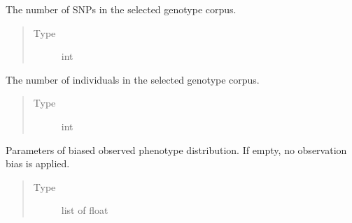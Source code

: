 \documentclass[a4paper,10pt,english]{sphinxhowto}
\begin{document}
\begin{fulllineitems}
\begin{fulllineitems}
\begin{quote}
\begin{description}
\end{description}\end{quote}

\end{fulllineitems}


\begin{fulllineitems}
\label{\detokenize{utils:utils.data_simulator.DataSimulator.total_num_snps}}
The number of SNPs in the selected genotype corpus.
\begin{quote}\begin{description}
\item[{Type}] \leavevmode
int

\end{description}\end{quote}

\end{fulllineitems}


\begin{fulllineitems}
\label{\detokenize{utils:utils.data_simulator.DataSimulator.total_num_inds}}
The number of individuals in the selected genotype corpus.
\begin{quote}\begin{description}
\item[{Type}] \leavevmode
int

\end{description}\end{quote}

\end{fulllineitems}


\begin{fulllineitems}
\label{\detokenize{utils:utils.data_simulator.DataSimulator.biased_distr}}
Parameters of biased observed phenotype distribution. If empty, no observation bias is applied.
\begin{quote}\begin{description}
\item[{Type}] \leavevmode
list of float


\end{description}
\end{quote}
\end{fulllineitems}
\end{fulllineitems}
\end{document}
